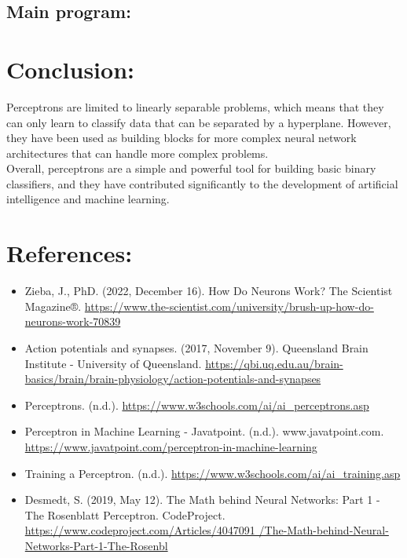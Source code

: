 \documentclass[12pt]{article}
\begin{document}
\subsection{Main program:}

\section{Conclusion:}
Perceptrons are limited to linearly separable problems, which means that they can only learn to
classify data that can be separated by a hyperplane. However, they have been used as building blocks
for more
complex neural network architectures that can handle more complex problems.\\
Overall, perceptrons are a simple and powerful tool for building basic binary classifiers, and
they have contributed significantly to the development of artificial intelligence and machine learning.


\section{References:}
\begin{itemize}
\item Zieba, J., PhD. (2022, December 16). How Do Neurons Work? The Scientist Magazine®.
  \url{https://www.the-scientist.com/university/brush-up-how-do-neurons-work-70839}
\item Action potentials and synapses. (2017, November 9). Queensland Brain Institute - University
  of Queensland.
  \url{https://qbi.uq.edu.au/brain-basics/brain/brain-physiology/action-potentials-and-synapses}
\item Perceptrons. (n.d.). \url{https://www.w3schools.com/ai/ai_perceptrons.asp}
\item Perceptron in Machine Learning - Javatpoint. (n.d.). www.javatpoint.com.
  \url{https://www.javatpoint.com/perceptron-in-machine-learning}
\item Training a Perceptron. (n.d.). \url{https://www.w3schools.com/ai/ai_training.asp}
\item Desmedt, S. (2019, May 12). The Math behind Neural Networks: Part 1 - The Rosenblatt Perceptron.
  CodeProject.
  \url{https://www.codeproject.com/Articles/4047091
    /The-Math-behind-Neural-Networks-Part-1-The-Rosenbl}
\end{itemize}
\end{document}
